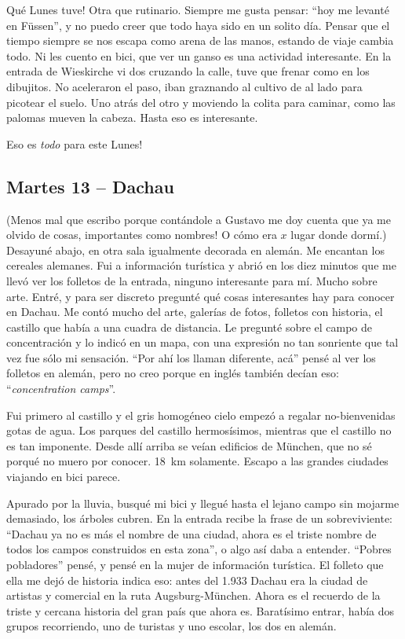 \textexclamdown Qu\'e Lunes tuve! Otra que rutinario. Siempre me gusta pensar:
``hoy me levant\'e en F\"ussen'', y no puedo creer que todo haya sido en un
solito d\'ia. Pensar que el tiempo siempre se nos escapa como arena de las
manos, estando de viaje cambia todo. Ni les cuento en bici, que ver un ganso
es una actividad interesante. En la entrada de Wieskirche vi dos  cruzando la
calle, tuve que frenar como en los dibujitos. No aceleraron el paso, iban
graznando al cultivo de al lado para picotear el suelo. Uno atr\'as del otro y
moviendo la colita para caminar, como las palomas mueven la cabeza. Hasta eso
es interesante.

\textexclamdown Eso es \emph{todo} para este Lunes!

\subsection*{Martes 13 -- Dachau}

(\textexclamdown Menos mal que escribo porque cont\'andole a Gustavo me doy
cuenta que ya me olvido de cosas, importantes como nombres! O c\'omo era $x$
lugar donde dorm\'i.)\\

Desayun\'e abajo, en otra sala igualmente decorada en alem\'an. Me encantan
los cereales alemanes. Fui a informaci\'on tur\'istica y abri\'o en los diez
minutos que me llev\'o ver los folletos de la entrada, ninguno interesante
para m\'i. Mucho sobre arte. Entr\'e, y para ser discreto pregunt\'e qu\'e
cosas interesantes hay para conocer en Dachau. Me cont\'o mucho del arte,
galer\'ias de fotos, folletos con historia, el castillo que hab\'ia a una
cuadra de distancia. Le pregunt\'e sobre el campo de concentraci\'on y lo
indic\'o en un mapa, con una expresi\'on no tan sonriente que tal vez fue
s\'olo mi sensaci\'on. ``Por ah\'i los llaman diferente, ac\'a'' pens\'e al
ver los folletos en alem\'an, pero no creo porque en ingl\'es tambi\'en
dec\'ian eso: ``\emph{concentration camps}''.

Fui primero al castillo y el gris homog\'eneo cielo empez\'o a regalar
no-bienvenidas gotas de agua. Los parques del castillo hermos\'isimos,
mientras que el castillo no es tan imponente. Desde all\'i arriba se ve\'ian
edificios de M\"unchen, que no s\'e porqu\'e no muero por conocer. 18~km
solamente. Escapo a las grandes ciudades viajando en bici parece.

Apurado por la lluvia, busqu\'e mi bici y llegu\'e hasta el lejano campo sin
mojarme demasiado, los \'arboles cubren. En la entrada recibe la frase de un
sobreviviente: ``Dachau ya no es m\'as el nombre de una ciudad, ahora es el
triste nombre de todos los campos construidos en esta zona'', o algo as\'i
daba a entender. ``Pobres pobladores'' pens\'e, y pens\'e en la mujer de
informaci\'on tur\'istica. El folleto que ella me dej\'o de historia indica
eso: antes del 1.933 Dachau era la ciudad de artistas y comercial en la ruta
Augsburg-M\"unchen. Ahora es el recuerdo de la triste y cercana historia del
gran pa\'is que ahora es. Barat\'isimo entrar, hab\'ia dos grupos recorriendo,
uno de turistas y uno escolar, los dos en alem\'an.

